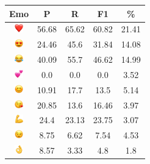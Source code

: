 \documentclass{article}
\begin{document}
\begin{table}
\centering
\begin{tabular}{|c|ccc|c|} \hline
\textbf{Emo} & \textbf{P} & \textbf{R} & \textbf{F1} & \textbf{\%} \\ \hline
\includegraphics[height=0.37cm,width=0.37cm]{img/red_heart.png} & 56.68 & 65.62 & 60.82 & 21.41\\ 
\includegraphics[height=0.37cm,width=0.37cm]{img/smiling_face_with_hearteyes.png} & 24.46 & 45.6 & 31.84 & 14.08\\ 
\includegraphics[height=0.37cm,width=0.37cm]{img/face_with_tears_of_joy.png} & 40.09 & 55.7 & 46.62 & 14.99\\ 
\includegraphics[height=0.37cm,width=0.37cm]{img/two_hearts.png} & 0.0 & 0.0 & 0.0 & 3.52\\ 
\includegraphics[height=0.37cm,width=0.37cm]{img/smiling_face_with_smiling_eyes.png} & 10.91 & 17.7 & 13.5 & 5.14\\ 
\includegraphics[height=0.37cm,width=0.37cm]{img/face_blowing_a_kiss.png} & 20.85 & 13.6 & 16.46 & 3.97\\ 
\includegraphics[height=0.37cm,width=0.37cm]{img/flexed_biceps.png} & 24.4 & 23.13 & 23.75 & 3.07\\ 
\includegraphics[height=0.37cm,width=0.37cm]{img/winking_face.png} & 8.75 & 6.62 & 7.54 & 4.53\\ 
\includegraphics[height=0.37cm,width=0.37cm]{img/OK_hand.png} & 8.57 & 3.33 & 4.8 & 1.8\\ 

\end{tabular}
\end{table}
\end{document}
